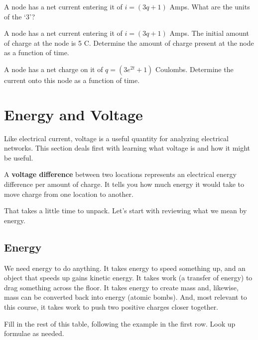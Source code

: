 \begin{alevel}
A node has a net current entering it of $i=(3q+1)$ Amps. What are the units of the `3'?
\end{alevel}

\begin{clevel}
A node has a net current entering it of $i=(3q+1)$ Amps. The initial amount of charge at the node  is 5 C. Determine the amount of charge present at the node as a function of time.
\end{clevel}

\begin{clevel}
A node has a net charge on it of $q=(3e^{2t}+1)$ Coulombs. Determine the current onto this node as a function of time.
\end{clevel}

\section{Energy and Voltage}
Like electrical current, voltage is a useful quantity for analyzing electrical networks. This section deals first with learning what voltage is and how it might be useful.\par

A \textbf{voltage difference} between two locations represents an electrical energy difference per amount of charge. It tells you how much energy it would take to move charge from one location to another. \par

That takes a little time to unpack. Let's start with reviewing what we mean by energy.

\subsection{Energy}
We need energy to do anything. It takes energy to speed something up, and an object that speeds up gains kinetic energy. It takes work (a transfer of energy) to drag something across the floor. It takes energy to create mass and, likewise, mass can be converted back into energy (atomic bombs). And, most relevant to this course, it takes work to push two positive charges closer together.\par

\par
\begin{clevel}
Fill in the rest of this table, following the example in the first row. Look up formulae as needed.
\end{clevel}

